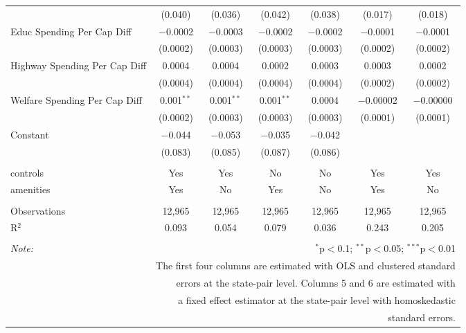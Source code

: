 \begin{table}[!htbp]
\begin{tabular}{@{\extracolsep{5pt}}lcccccc}
  & (0.040) & (0.036) & (0.042) & (0.038) & (0.017) & (0.018) \\ 
  Educ Spending Per Cap Diff & $-$0.0002 & $-$0.0003 & $-$0.0002 & $-$0.0002 & $-$0.0001 & $-$0.0001 \\ 
  & (0.0002) & (0.0003) & (0.0003) & (0.0003) & (0.0002) & (0.0002) \\ 
  Highway Spending Per Cap Diff & 0.0004 & 0.0004 & 0.0002 & 0.0003 & 0.0003 & 0.0002 \\ 
  & (0.0004) & (0.0004) & (0.0004) & (0.0004) & (0.0002) & (0.0002) \\ 
  Welfare Spending Per Cap Diff & 0.001$^{**}$ & 0.001$^{**}$ & 0.001$^{**}$ & 0.0004 & $-$0.00002 & $-$0.00000 \\ 
  & (0.0002) & (0.0003) & (0.0003) & (0.0003) & (0.0001) & (0.0001) \\ 
  Constant & $-$0.044 & $-$0.053 & $-$0.035 & $-$0.042 &  &  \\ 
  & (0.083) & (0.085) & (0.087) & (0.086) &  &  \\ 
 \hline \\[-1.8ex] 
controls & Yes & Yes & No & No & Yes & Yes \\ 
amenities & Yes & No & Yes & No & Yes & No \\ 
\hline \\[-1.8ex] 
Observations & 12,965 & 12,965 & 12,965 & 12,965 & 12,965 & 12,965 \\ 
R$^{2}$ & 0.093 & 0.054 & 0.079 & 0.036 & 0.243 & 0.205 \\ 
\hline 
\hline \\[-1.8ex] 
\textit{Note:}  & \multicolumn{6}{r}{$^{*}$p$<$0.1; $^{**}$p$<$0.05; $^{***}$p$<$0.01} \\ 
 & \multicolumn{6}{r}{The first four columns are estimated with OLS and clustered standard} \\ 
 & \multicolumn{6}{r}{ errors at the state-pair level. Columns 5 and 6 are estimated with} \\ 
 & \multicolumn{6}{r}{a fixed effect estimator at the state-pair level with homoskedastic} \\ 
 & \multicolumn{6}{r}{standard errors.} \\ 
\end{tabular} 
\end{table} 
